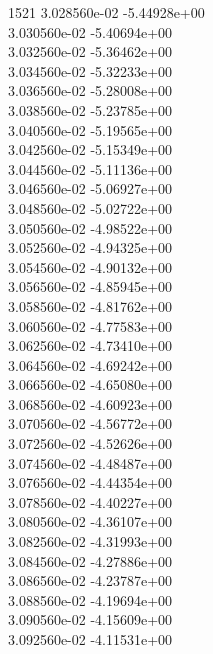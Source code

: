 1521	3.028560e-02	-5.44928e+00	\\ 	3.030560e-02	-5.40694e+00	\\ 	3.032560e-02	-5.36462e+00	\\ 	3.034560e-02	-5.32233e+00	\\ 	3.036560e-02	-5.28008e+00	\\ 	3.038560e-02	-5.23785e+00	\\ 	3.040560e-02	-5.19565e+00	\\ 	3.042560e-02	-5.15349e+00	\\ 	3.044560e-02	-5.11136e+00	\\ 	3.046560e-02	-5.06927e+00	\\ 	3.048560e-02	-5.02722e+00	\\ 	3.050560e-02	-4.98522e+00	\\ 	3.052560e-02	-4.94325e+00	\\ 	3.054560e-02	-4.90132e+00	\\ 	3.056560e-02	-4.85945e+00	\\ 	3.058560e-02	-4.81762e+00	\\ 	3.060560e-02	-4.77583e+00	\\ 	3.062560e-02	-4.73410e+00	\\ 	3.064560e-02	-4.69242e+00	\\ 	3.066560e-02	-4.65080e+00	\\ 	3.068560e-02	-4.60923e+00	\\ 	3.070560e-02	-4.56772e+00	\\ 	3.072560e-02	-4.52626e+00	\\ 	3.074560e-02	-4.48487e+00	\\ 	3.076560e-02	-4.44354e+00	\\ 	3.078560e-02	-4.40227e+00	\\ 	3.080560e-02	-4.36107e+00	\\ 	3.082560e-02	-4.31993e+00	\\ 	3.084560e-02	-4.27886e+00	\\ 	3.086560e-02	-4.23787e+00	\\ 	3.088560e-02	-4.19694e+00	\\ 	3.090560e-02	-4.15609e+00	\\ 	3.092560e-02	-4.11531e+00	\\ \hline
